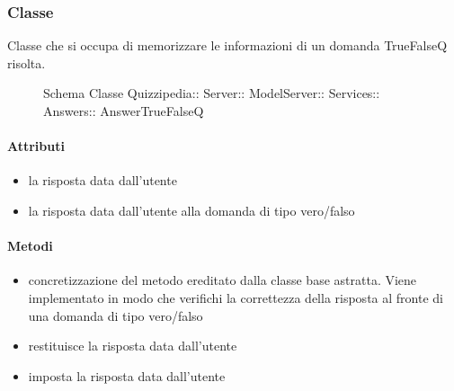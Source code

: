 \subsubsection{Classe }
Classe che si occupa di memorizzare le informazioni di un domanda TrueFalseQ risolta.
\begin{figure}[H]
\centering
\noindent{}
\caption[Schema Classe AnswerTrueFalseQ]{Schema Classe Quizzipedia:: Server:: ModelServer:: Services:: Answers:: AnswerTrueFalseQ}
\end{figure}
\paragraph{Attributi}
\begin{itemize}
\item {}
\newline
la risposta data dall'utente
\item {}
\newline
la risposta data dall'utente alla domanda di tipo vero/falso
\end{itemize}
\paragraph{Metodi}
\begin{itemize}
\item {}
\newline
concretizzazione del metodo ereditato dalla classe base astratta. Viene implementato in modo che verifichi la correttezza della risposta al fronte di una domanda di tipo vero/falso
\newline
\item {}
\newline
restituisce la risposta data dall'utente
\newline
\item {}
\newline
imposta la risposta data dall'utente
\newline
\end{itemize}
